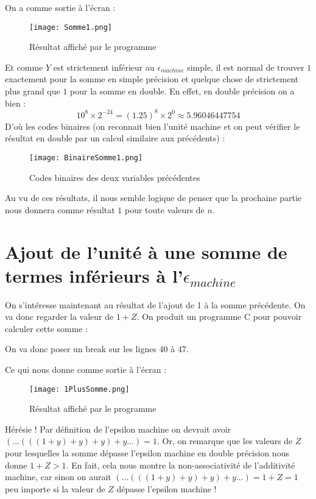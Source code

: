 \documentclass[a4paper, titlepage]{livret} %
\begin{document}
			On a comme sortie à l'écran :
			\begin{figure}[!h]
				\centering
  					\texttt{[image: Somme1.png]}
  					\caption{Résultat affiché par le programme}
			\end{figure}

			Et comme $Y$ est strictement inférieur au $\epsilon_{machine}$ simple, il est normal de trouver $1$ exactement pour la somme en simple précision et quelque chose de strictement plus grand que $1$ pour la somme en double.
			En effet, en double précision on a bien :
			\[
				10^{8}\times2^{-24} = (1.25)^{8}\times2^{0} \approx 5.96046447754
			\]
			D'où les codes binaires (on reconnait bien l'unité machine et on peut vérifier le résultat en double par un calcul similaire aux précédents) :
			\begin{figure}[!h]
				\centering
  					\texttt{[image: BinaireSomme1.png]}
  					\caption{Codes binaires des deux variables précédentes}
			\end{figure}

			Au vu de ces résultats, il nous semble logique de penser que la prochaine partie nous donnera comme résultat $1$ pour toute valeurs de $n$.


	\chapter{Ajout de l'unité à une somme de termes inférieurs à l'$\epsilon_{machine}$}
		On s'intéresse maintenant au résultat de l'ajout de 1 à la somme précédente.
		On va donc regarder la valeur de $1 + Z$.
		On produit un programme C pour pouvoir calculer cette somme :
		
		On va donc poser un break sur les lignes 40 à 47.

		Ce qui nous donne comme sortie à l'écran :
		\begin{figure}[!h]
			\centering
  				\texttt{[image: 1PlusSomme.png]}
  				\caption{Résultat affiché par le programme}
		\end{figure}

		Hérésie !
		Par définition de l'epsilon machine on devrait avoir $(…(((1 + y) + y) + y) + y …) = 1$.
		Or, on remarque que les valeurs de $Z$ pour lesquelles la somme dépasse l'epsilon machine en double précision nous donne $1 + Z > 1$.
		En fait, cela nous montre la non-associativité de l'additivité machine, car sinon on aurait $(…(((1 + y) + y) + y) + y …) = 1 + Z = 1$ peu importe si la valeur de $Z$ dépasse l'epsilon machine !
\end{document}
